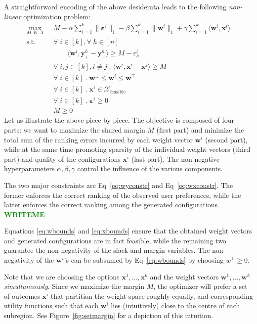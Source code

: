 \documentclass{article}
\renewcommand\[{\begin{equation}}
\renewcommand\]{\end{equation}}
\newcommand{\calvar}[1]{\ensuremath{\mathcal{#1}}}
\newcommand{\calX}{\calvar{X}}
\newcommand{\vecvar}[1]{\ensuremath{\boldsymbol{#1}}}
\newcommand{\vw}{\vecvar{w}}
\newcommand{\vx}{\vecvar{x}}
\newcommand{\vy}{\vecvar{y}}
\newcommand{\veps}{\vecvar{\varepsilon}}
\newcommand{\stefano}[1]{{\bf \textcolor{green}{{\fbox{Stefano:} #1}}}}
\begin{document}
A straightforward encoding of the above desiderata leads to the following {\em
non-linear} optimization problem:
%
{\footnotesize
\begin{align}
    \max_{M, W, X}
        & \;\; M - \alpha \sum_{i=1}^k \| \veps^{i} \|_1 - \beta \sum_{i=1}^k \| \vw^{i} \|_1 + \gamma \sum_{i=1}^k \langle \vw^{i}, \vx^{i} \rangle
        \nonumber
    \\
    \text{s.t.}
        & \;\; \forall \; i \in [k], \forall \; h \in [n] \nonumber
    \\
        & \;\; \qquad \langle \vw^{i}, \vy^{h}_+ - \vy^{h}_- \rangle \ge M - \varepsilon^{i}_h \label{eq:wyconstr}
    \\
        & \;\; \forall \; i, j \in [k], i \neq j \;.\; \langle \vw^{i}, \vx^{i} - \vx^{j} \rangle \ge M \label{eq:wxconstr}
    \\
        & \;\; \forall \; i \in [k] \;.\; \vw^\bot \le \vw^{i} \le \vw^\top \label{eq:wbounds}
    \\
        & \;\; \forall \; i \in [k] \;.\; \vx^{i} \in \calX_{\text{feasible}} \label{eq:xbounds}
    \\
        & \;\; \forall \; i \in [k] \;.\; \veps^{i} \ge 0 \nonumber
    \\
        & \;\; M \ge 0 \nonumber
\end{align}
}
%
Let us illustrate the above piece by piece. The objective is composed of four
parts: we want to maximize the shared margin $M$ (first part) and minimize the
total sum of the ranking errors incurred by each weight vector $\vw^{i}$
(second part), while at the same time promoting sparsity of the individual
weight vectors (third part) and quality of the configurations $\vx^{i}$ (last
part). The non-negative hyperparameters $\alpha,\beta,\gamma$ control the
influence of the various components.

The two major constraints are Eq~\ref{eq:wyconstr} and Eq~\ref{eq:wxconstr}.
The former enforces the correct ranking of the observed user preferences, while
the latter enforces the correct ranking among the generated configurations.
\stefano{WRITEME}

Equations \ref{eq:wbounds} and \ref{eq:xbounds} ensure that the obtained weight
vectors and generated configurations are in fact feasible, while the remaining
two guarantee the non-negativity of the slack and margin variables.  The
non-negativity of the $\vw^{i}$'s can be subsumed by Eq~\ref{eq:wbounds}
by choosing $w^\bot \ge 0$.

Note that we are choosing the options $\vx^{1}, \ldots, \vx^{k}$ and the
weight vectors $\vw^{1}, \ldots, \vw^{k}$ {\em simultaneously}. Since we
maximize the margin $M$, the optimizer will prefer a set of outcomes
$\vx^{i}$ that partition the weight space roughly equally, and corresponding
utility functions such that each $\vw^{i}$ lies (intuitively) close to the
centre of each subregion. See Figure~\ref{fig:setmargin} for a depiction of
this intuition.
\end{document}
